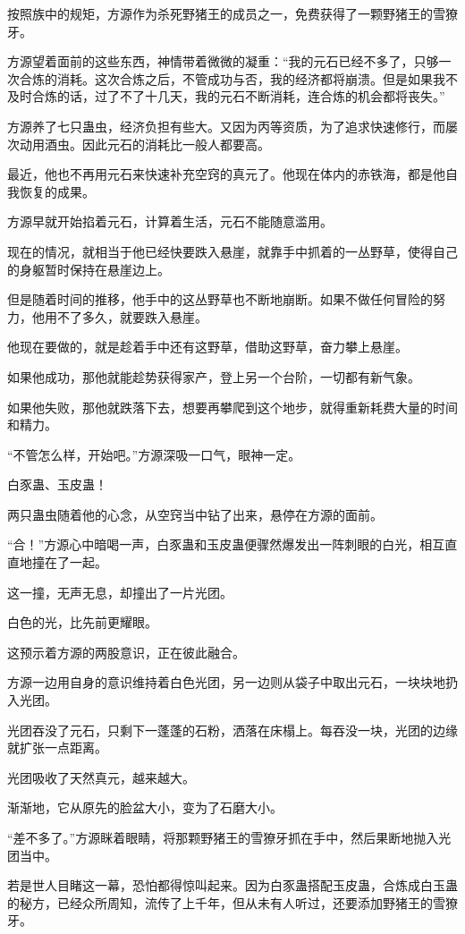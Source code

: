 \begin{this_body}
按照族中的规矩，方源作为杀死野猪王的成员之一，免费获得了一颗野猪王的雪獠牙。

方源望着面前的这些东西，神情带着微微的凝重：“我的元石已经不多了，只够一次合炼的消耗。这次合炼之后，不管成功与否，我的经济都将崩溃。但是如果我不及时合炼的话，过了不了十几天，我的元石不断消耗，连合炼的机会都将丧失。”

方源养了七只蛊虫，经济负担有些大。又因为丙等资质，为了追求快速修行，而屡次动用酒虫。因此元石的消耗比一般人都要高。

最近，他也不再用元石来快速补充空窍的真元了。他现在体内的赤铁海，都是他自我恢复的成果。

方源早就开始掐着元石，计算着生活，元石不能随意滥用。

现在的情况，就相当于他已经快要跌入悬崖，就靠手中抓着的一丛野草，使得自己的身躯暂时保持在悬崖边上。

但是随着时间的推移，他手中的这丛野草也不断地崩断。如果不做任何冒险的努力，他用不了多久，就要跌入悬崖。

他现在要做的，就是趁着手中还有这野草，借助这野草，奋力攀上悬崖。

如果他成功，那他就能趁势获得家产，登上另一个台阶，一切都有新气象。

如果他失败，那他就跌落下去，想要再攀爬到这个地步，就得重新耗费大量的时间和精力。

“不管怎么样，开始吧。”方源深吸一口气，眼神一定。

白豕蛊、玉皮蛊！

两只蛊虫随着他的心念，从空窍当中钻了出来，悬停在方源的面前。

“合！”方源心中暗喝一声，白豕蛊和玉皮蛊便骤然爆发出一阵刺眼的白光，相互直直地撞在了一起。

这一撞，无声无息，却撞出了一片光团。

白色的光，比先前更耀眼。

这预示着方源的两股意识，正在彼此融合。

方源一边用自身的意识维持着白色光团，另一边则从袋子中取出元石，一块块地扔入光团。

光团吞没了元石，只剩下一蓬蓬的石粉，洒落在床榻上。每吞没一块，光团的边缘就扩张一点距离。

光团吸收了天然真元，越来越大。

渐渐地，它从原先的脸盆大小，变为了石磨大小。

“差不多了。”方源眯着眼睛，将那颗野猪王的雪獠牙抓在手中，然后果断地抛入光团当中。

若是世人目睹这一幕，恐怕都得惊叫起来。因为白豕蛊搭配玉皮蛊，合炼成白玉蛊的秘方，已经众所周知，流传了上千年，但从未有人听过，还要添加野猪王的雪獠牙。


\end{this_body}
